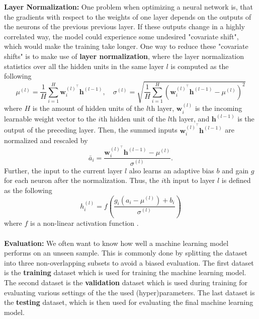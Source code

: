 \documentclass[./main.tex]{subfiles}
\begin{document}
\noindent \textbf{Layer Normalization: } One problem when optimizing a neural network is, that the gradients with respect to the weights of one layer depends on the outputs of the neurons of the previous previous layer. If these outputs change in a highly correlated way, the model could experience some undesired "covariate shift", which would make the training take longer. One way to reduce these "covariate shifts" is to make use of \textbf{layer normalization}, where the layer normalization statistics over all the hidden units in the same layer $l$ is computed as the following
\begin{equation}
    \mu^{(l)} = \frac{1}{H} \sum_{i = 1} ^H \bm{w}_i^{(l)^\top}\bm{h}^{(l - 1)}, \quad \sigma^{(l)} = \sqrt{\frac{1}{H} \sum_{i = 1} ^H \left(\bm{w}_i^{(l)^\top}\bm{h}^{(l - 1)} - \mu^{(l)}\right)^2}
\end{equation}
where $H$ is the amount of hidden units of the $l$th layer, $\bm{w}_i^{(l)}$ is the incoming learnable weight vector to the $i$th hidden unit of the $l$th layer, and $\bm{h}^{(l - 1)}$ is the output of the preceding layer. Then, the summed inputs $\bm{w}^{(l)^\top} _i \bm{h}^{(l - 1)}$ are normalized and rescaled by
\begin{equation}
    \bar{a}_i = \frac{\bm{w}^{(l)^\top} _i \bm{h}^{(l - 1)} - \mu^{(l)}}{\sigma^{(l)}}.
\end{equation}
Further, the input to the current layer $l$ also learns an adaptive bias $b$ and gain $g$ for each neuron after the normalization. Thus, the $i$th input to layer $l$ is defined as the following
\begin{equation}
    h_i ^{(l)} = f\left(\frac{g_i(a_i - \mu^{(l)}) + b_i}{\sigma^{(l)}} \right)
\end{equation}
where $f$ is a non-linear activation function \cite{ba2016layer}.
\\
\\
\noindent \textbf{Evaluation:} We often want to know how well a machine learning model performs on an unseen sample. This is commonly done by splitting the dataset into three non-overlapping subsets to avoid a biased evaluation. The first dataset is the \textbf{training} dataset which is used for training the machine learning model. The second dataset is the \textbf{validation} dataset which is used during training for evaluating various settings of the the used (hyper)parameters. The last dataset is the \textbf{testing} dataset, which is then used for evaluating the final machine learning model.
\\
\end{document}
